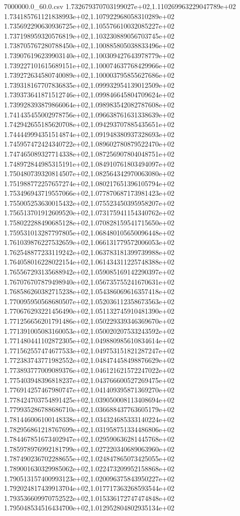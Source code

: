 \begin{filecontents*}{7000000.0_60.0.csv}
1.732679370703199027e+02,1.110269963229047789e+02
1.734185761121838993e+02,1.107922968058310289e+02
1.735692290630936725e+02,1.105576610032085227e+02
1.737198959320576819e+02,1.103230889056703745e+02
1.738705767280788450e+02,1.100885805038833496e+02
1.739076196239903140e+02,1.100309427643978779e+02
1.739227101615689151e+02,1.100074637768429966e+02
1.739272634580740089e+02,1.100003795855627686e+02
1.739318167707836835e+02,1.099932954139012509e+02
1.739373641871512746e+02,1.099846645804709624e+02
1.739928393879866064e+02,1.098983542082787608e+02
1.741435455002978756e+02,1.096638761631338639e+02
1.742942655185620708e+02,1.094293707885435651e+02
1.744449994351514874e+02,1.091948380937328693e+02
1.745957472424340722e+02,1.089602780879522470e+02
1.747465089327714338e+02,1.087256907804048751e+02
1.748972844985315191e+02,1.084910761803494097e+02
1.750480739320814507e+02,1.082564342970063080e+02
1.751988772257657274e+02,1.080217651396105794e+02
1.753496943719557066e+02,1.077870687173981423e+02
1.755005253630015432e+02,1.075523450395958207e+02
1.756513701912609520e+02,1.073175941154340762e+02
1.758022288490685128e+02,1.070828159541715650e+02
1.759531013287797805e+02,1.068480105650096448e+02
1.761039876227532659e+02,1.066131779572006053e+02
1.762548877233119242e+02,1.063783181399739988e+02
1.764058016228022154e+02,1.061434311225748388e+02
1.765567293135688942e+02,1.059085169142290397e+02
1.767076707879498940e+02,1.056735755241670631e+02
1.768586260382715238e+02,1.054386069616357418e+02
1.770095950568680507e+02,1.052036112358673563e+02
1.770676293221456490e+02,1.051132745910481390e+02
1.771256656201791486e+02,1.050229339346369670e+02
1.771391005083160053e+02,1.050020207533243592e+02
1.771480441102872305e+02,1.049880985610834614e+02
1.771562557474677533e+02,1.049753151821287247e+02
1.772383743771982552e+02,1.048474458498876629e+02
1.773893777009089376e+02,1.046121621572247022e+02
1.775403948396818237e+02,1.043766600527269475e+02
1.776914257467980747e+02,1.041409395871369270e+02
1.778424703754891425e+02,1.039050008113408694e+02
1.779935286788686710e+02,1.036688437763605179e+02
1.781446006100148338e+02,1.034324685333140224e+02
1.782956861218767699e+02,1.031958751334486806e+02
1.784467851673402947e+02,1.029590636281445768e+02
1.785978976992181799e+02,1.027220340689063960e+02
1.787490236702288655e+02,1.024847865073425055e+02
1.789001630329985062e+02,1.022473209952158868e+02
1.790513157400993123e+02,1.020096375843950227e+02
1.792024817439913704e+02,1.017717363268593544e+02
1.793536609970752522e+02,1.015336172747474848e+02
1.795048534516434700e+02,1.012952804802935134e+02

\end{filecontents*}
